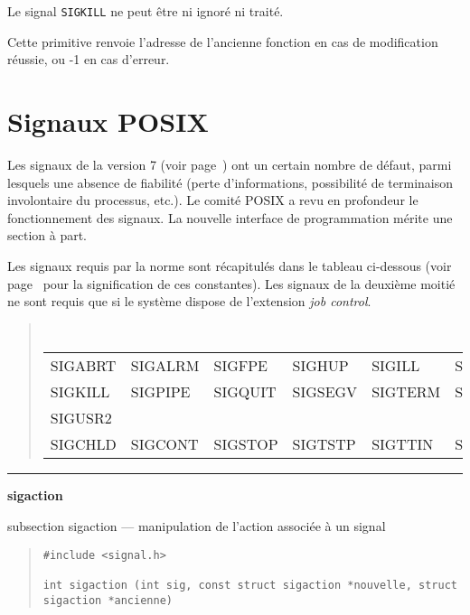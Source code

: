 \documentclass [twoside] {report}
\newcommand {\primitive} [1]
    {
	{\large \bf #1}
	\addcontentsline {toc} {subsection} {#1}
    }
\newcommand {\separation}
    {
	\vspace {7mm}
	\nopagebreak
	\hrule
    }
\begin{document}
Le signal {\tt SIGKILL} ne peut être ni ignoré ni
traité.

Cette primitive renvoie l'adresse de l'ancienne
fonction en cas de modification réussie, ou -1 en
cas d'erreur.



\section {Signaux POSIX}

Les signaux de la version 7 (voir page~\pageref {ps:sigv7}) ont un
certain nombre de défaut, parmi lesquels une absence de fiabilité (perte
d'informations, possibilité de terminaison involontaire du processus,
etc.).  Le comité POSIX a revu en profondeur le fonctionnement des
signaux.  La nouvelle interface de programmation mérite une section à
part.

Les signaux requis par la norme sont récapitulés dans le tableau
ci-dessous (voir page~\pageref {ps:sigv7} pour la signification de ces
constantes).  Les signaux de la deuxième moitié ne sont requis que si le
système dispose de l'extension {\em job control}.

\begin {quote}
    \small\tt
    \begin {tabular} {|llllll|} \hline
	SIGABRT & SIGALRM & SIGFPE  & SIGHUP  & SIGILL  & SIGINT  \\
	SIGKILL & SIGPIPE & SIGQUIT & SIGSEGV & SIGTERM & SIGUSR1 \\
	SIGUSR2 &         &         &         &         &         \\ \hline
	SIGCHLD & SIGCONT & SIGSTOP & SIGTSTP & SIGTTIN & SIGTTOU \\ \hline
    \end {tabular}
\end {quote}



\separation
\primitive {sigaction} --- manipulation de l'action associée à un signal

\begin {quote}
\begin {verbatim}
#include <signal.h>

int sigaction (int sig, const struct sigaction *nouvelle, struct sigaction *ancienne)
\end{verbatim}
\end {quote}
\end{document}
